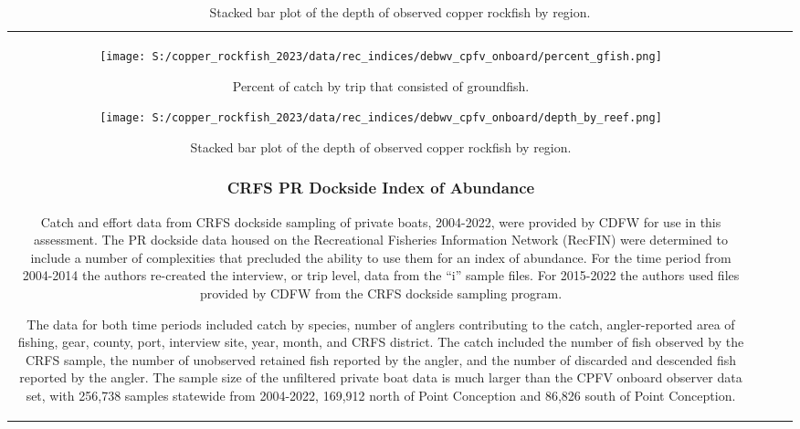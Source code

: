 \documentclass[11pt,
  letterpaper,
]{article}
\begin{document}
\begin{longtable}[t]{c>{\centering\arraybackslash}p{2cm}>{\centering\arraybackslash}p{2cm}>{\centering\arraybackslash}p{2cm}}
\begin{figure}
{\centering
\texttt{[image: S:/copper\_rockfish\_2023/data/rec\_indices/debwv\_cpfv\_onboard/percent\_gfish.png]}
}
\caption{Percent of catch by trip that consisted of groundfish.\label{fig:deb-percent-gfish}}
\end{figure}

\begin{figure}
{\centering
\texttt{[image: S:/copper\_rockfish\_2023/data/rec\_indices/debwv\_cpfv\_onboard/depth\_by\_reef.png]}
}
\caption{Stacked bar plot of the depth of observed copper rockfish by region.\label{fig:deb-depths}}
\end{figure}

\subsubsection{CRFS PR Dockside Index of Abundance}\label{crfs-pr-index}

Catch and effort data from CRFS dockside sampling of private boats, 2004-2022, were provided by CDFW for use in this assessment. The PR dockside data housed on the Recreational Fisheries Information Network (RecFIN) were determined to include a number of complexities that precluded the ability to use them for an index of abundance. For the time period from 2004-2014 the authors re-created the interview, or trip level, data from the ``i'' sample files. For 2015-2022 the authors used files provided by CDFW from the CRFS dockside sampling program.

The data for both time periods included catch by species, number of anglers contributing to the catch, angler-reported area of fishing, gear, county, port, interview site, year, month, and CRFS district. The catch included the number of fish observed by the CRFS sample, the number of unobserved retained fish reported by the angler, and the number of discarded and descended fish reported by the angler. The sample size of the unfiltered private boat data is much larger than the CPFV onboard observer data set, with 256,738 samples statewide from 2004-2022, 169,912 north of Point Conception and 86,826 south of Point Conception.


\end{longtable}
\end{document}
